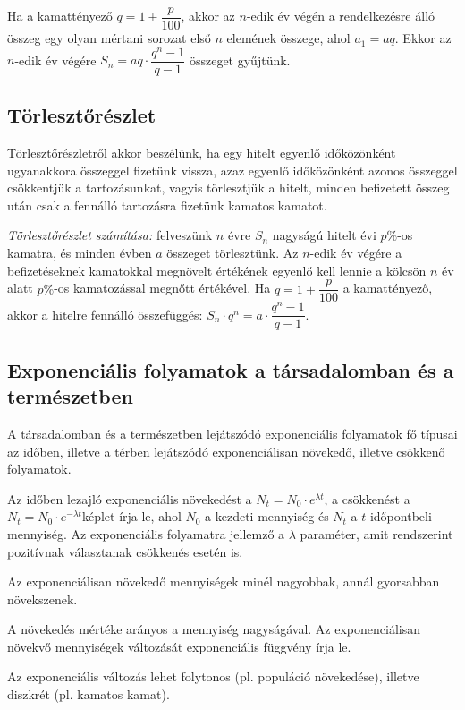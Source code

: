 \documentclass[12pt,a4paper]{article}
\begin{document}
Ha a kamattényező $q=1+\dfrac{p}{100}$, akkor az $n$-edik év végén a rendelkezésre álló összeg egy olyan
mértani sorozat első $n$ elemének összege, ahol $a_1 = aq$. Ekkor az $n$-edik év végére $S_n=aq\cdot \dfrac{q^n-1}{q-1}$ összeget gyűjtünk.

\subsection{Törlesztőrészlet}
Törlesztőrészletről akkor beszélünk, ha egy hitelt egyenlő időközönként ugyanakkora összeggel fizetünk vissza, azaz egyenlő időközönként azonos összeggel csökkentjük a tartozásunkat, vagyis törlesztjük a hitelt, minden befizetett összeg után csak a fennálló tartozásra fizetünk kamatos kamatot.

\textit{Törlesztőrészlet számítása:} felveszünk $n$ évre $S_n$ nagyságú hitelt évi $p\%$-os kamatra, és minden évben $a$ összeget törlesztünk. Az $n$-edik év végére a befizetéseknek kamatokkal megnövelt értékének egyenlő kell lennie a kölcsön $n$ év alatt $p\%$-os kamatozással megnőtt értékével. Ha $q=1+\dfrac{p}{100}$ a kamattényező, akkor a hitelre fennálló összefüggés: $S_n\cdot q^n=a\cdot \dfrac{q^n-1}{q-1}$.



\subsection{Exponenciális folyamatok a társadalomban és a természetben}
A társadalomban és a természetben lejátszódó exponenciális folyamatok fő típusai az időben, illetve a térben lejátszódó exponenciálisan növekedő, illetve csökkenő folyamatok.

Az időben lezajló exponenciális növekedést a $N_t=N_0\cdot e^{\lambda t}$, a csökkenést a $N_t=N_0\cdot e^{-\lambda t}$képlet írja le, ahol $N_0$ a kezdeti mennyiség és $N_t$ a $t$ időpontbeli mennyiség. Az exponenciális folyamatra jellemző a $\lambda$ paraméter, amit rendszerint pozitívnak választanak csökkenés esetén is.

Az exponenciálisan növekedő mennyiségek minél nagyobbak, annál gyorsabban növekszenek.

A növekedés mértéke arányos a mennyiség nagyságával. Az exponenciálisan növekvő mennyiségek változását exponenciális függvény írja le.

Az exponenciális változás lehet folytonos (pl. populáció növekedése), illetve diszkrét (pl. kamatos
kamat).
\end{document}
